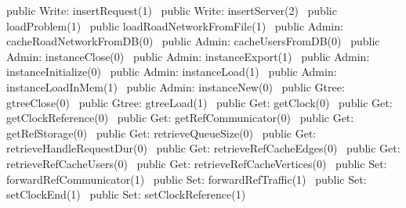 public \LA{}Write: insertRequest(1)~{\nwtagstyle{}}\RA{}
public \LA{}Write: insertServer(2)~{\nwtagstyle{}}\RA{}
public \LA{}loadProblem(1)~{\nwtagstyle{}}\RA{}
public \LA{}loadRoadNetworkFromFile(1)~{\nwtagstyle{}}\RA{}
\nwendcode{}\nwdocspar
{}
\nwenddocs{}\plusendmoddef
public \LA{}Admin: cacheRoadNetworkFromDB(0)~{\nwtagstyle{}}\RA{}
public \LA{}Admin: cacheUsersFromDB(0)~{\nwtagstyle{}}\RA{}
public \LA{}Admin: instanceClose(0)~{\nwtagstyle{}}\RA{}
public \LA{}Admin: instanceExport(1)~{\nwtagstyle{}}\RA{}
public \LA{}Admin: instanceInitialize(0)~{\nwtagstyle{}}\RA{}
public \LA{}Admin: instanceLoad(1)~{\nwtagstyle{}}\RA{}
public \LA{}Admin: instanceLoadInMem(1)~{\nwtagstyle{}}\RA{}
public \LA{}Admin: instanceNew(0)~{\nwtagstyle{}}\RA{}
public \LA{}Gtree: gtreeClose(0)~{\nwtagstyle{}}\RA{}
public \LA{}Gtree: gtreeLoad(1)~{\nwtagstyle{}}\RA{}
public \LA{}Get: getClock(0)~{\nwtagstyle{}}\RA{}
public \LA{}Get: getClockReference(0)~{\nwtagstyle{}}\RA{}
public \LA{}Get: getRefCommunicator(0)~{\nwtagstyle{}}\RA{}
public \LA{}Get: getRefStorage(0)~{\nwtagstyle{}}\RA{}
public \LA{}Get: retrieveQueueSize(0)~{\nwtagstyle{}}\RA{}
public \LA{}Get: retrieveHandleRequestDur(0)~{\nwtagstyle{}}\RA{}
public \LA{}Get: retrieveRefCacheEdges(0)~{\nwtagstyle{}}\RA{}
public \LA{}Get: retrieveRefCacheUsers(0)~{\nwtagstyle{}}\RA{}
public \LA{}Get: retrieveRefCacheVertices(0)~{\nwtagstyle{}}\RA{}
public \LA{}Set: forwardRefCommunicator(1)~{\nwtagstyle{}}\RA{}
public \LA{}Set: forwardRefTraffic(1)~{\nwtagstyle{}}\RA{}
public \LA{}Set: setClockEnd(1)~{\nwtagstyle{}}\RA{}
public \LA{}Set: setClockReference(1)~{\nwtagstyle{}}\RA{}
